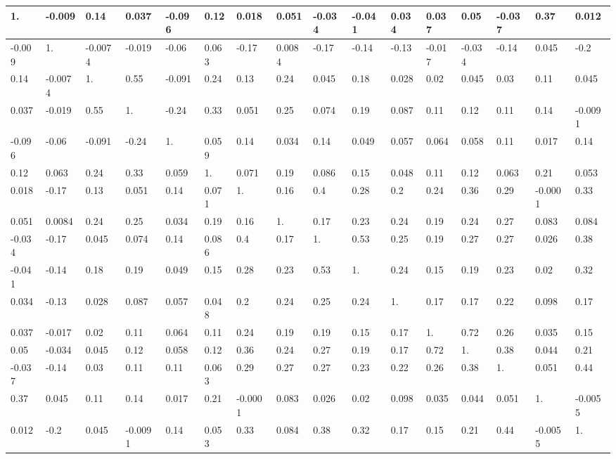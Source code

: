\documentclass[10pt]{article}
\begin{document}
\begin{center}
\begin{tabular}{|l|l|l|l|l|l|l|l|l|l|l|l|l|l|l|l|}
\hline
1. & -0.009 & 0.14 & 0.037 & -0.096 & 0.12 & 0.018 & 0.051 & -0.034 & -0.041 & 0.034 & 0.037 & 0.05 & -0.037 & 0.37 & 0.012 \\
\hline
-0.009 & 1. & -0.0074 & -0.019 & -0.06 & 0.063 & -0.17 & 0.0084 & -0.17 & -0.14 & -0.13 & -0.017 & -0.034 & -0.14 & 0.045 & -0.2 \\
\hline
0.14 & -0.0074 & 1. & 0.55 & -0.091 & 0.24 & 0.13 & 0.24 & 0.045 & 0.18 & 0.028 & 0.02 & 0.045 & 0.03 & 0.11 & 0.045 \\
\hline
0.037 & -0.019 & 0.55 & 1. & -0.24 & 0.33 & 0.051 & 0.25 & 0.074 & 0.19 & 0.087 & 0.11 & 0.12 & 0.11 & 0.14 & -0.0091 \\
\hline
-0.096 & -0.06 & -0.091 & -0.24 & 1. & 0.059 & 0.14 & 0.034 & 0.14 & 0.049 & 0.057 & 0.064 & 0.058 & 0.11 & 0.017 & 0.14 \\
\hline
0.12 & 0.063 & 0.24 & 0.33 & 0.059 & 1. & 0.071 & 0.19 & 0.086 & 0.15 & 0.048 & 0.11 & 0.12 & 0.063 & 0.21 & 0.053 \\
\hline
0.018 & -0.17 & 0.13 & 0.051 & 0.14 & 0.071 & 1. & 0.16 & 0.4 & 0.28 & 0.2 & 0.24 & 0.36 & 0.29 & -0.0001 & 0.33 \\
\hline
0.051 & 0.0084 & 0.24 & 0.25 & 0.034 & 0.19 & 0.16 & 1. & 0.17 & 0.23 & 0.24 & 0.19 & 0.24 & 0.27 & 0.083 & 0.084 \\
\hline
-0.034 & -0.17 & 0.045 & 0.074 & 0.14 & 0.086 & 0.4 & 0.17 & 1. & 0.53 & 0.25 & 0.19 & 0.27 & 0.27 & 0.026 & 0.38 \\
\hline
-0.041 & -0.14 & 0.18 & 0.19 & 0.049 & 0.15 & 0.28 & 0.23 & 0.53 & 1. & 0.24 & 0.15 & 0.19 & 0.23 & 0.02 & 0.32 \\
\hline
0.034 & -0.13 & 0.028 & 0.087 & 0.057 & 0.048 & 0.2 & 0.24 & 0.25 & 0.24 & 1. & 0.17 & 0.17 & 0.22 & 0.098 & 0.17 \\
\hline
0.037 & -0.017 & 0.02 & 0.11 & 0.064 & 0.11 & 0.24 & 0.19 & 0.19 & 0.15 & 0.17 & 1. & 0.72 & 0.26 & 0.035 & 0.15 \\
\hline
0.05 & -0.034 & 0.045 & 0.12 & 0.058 & 0.12 & 0.36 & 0.24 & 0.27 & 0.19 & 0.17 & 0.72 & 1. & 0.38 & 0.044 & 0.21 \\
\hline
-0.037 & -0.14 & 0.03 & 0.11 & 0.11 & 0.063 & 0.29 & 0.27 & 0.27 & 0.23 & 0.22 & 0.26 & 0.38 & 1. & 0.051 & 0.44 \\
\hline
0.37 & 0.045 & 0.11 & 0.14 & 0.017 & 0.21 & -0.0001 & 0.083 & 0.026 & 0.02 & 0.098 & 0.035 & 0.044 & 0.051 & 1. & -0.0055 \\
\hline
0.012 & -0.2 & 0.045 & -0.0091 & 0.14 & 0.053 & 0.33 & 0.084 & 0.38 & 0.32 & 0.17 & 0.15 & 0.21 & 0.44 & -0.0055 & 1. \\
\hline
\end{tabular}
\end{center}
\end{document}
